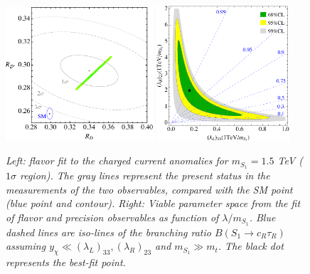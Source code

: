\documentclass[11pt]{cernrep}
\begin{document}
 \begin{figure}[!htp]
  \centering
  \includegraphics[width=0.49\textwidth]{./figures/FlavorFit_RDRDst.pdf} 
  \includegraphics[width=0.44\textwidth]{./figures/FlavorFit_S1.pdf} 
  \caption{\it Left: flavor fit to the charged current anomalies for $m_{S_1}=1.5$ TeV ($1\sigma$ region). The gray lines represent the present status in the measurements of the two observables, compared with the SM point (blue point and contour). Right: Viable parameter space from the fit of flavor and precision observables as function of $\lambda / m_{S_1}$. Blue dashed lines are iso-lines of the branching ratio $B(S_1 \to c_R \tau_R)$ assuming $y_\chi \ll (\lambda_L)_{33}, (\lambda_R)_{23}$ and $m_{S_1} \gg m_t$. The black dot represents the best-fit point.}
\label{fig:FlaFit}
\end{figure}
\end{document}
